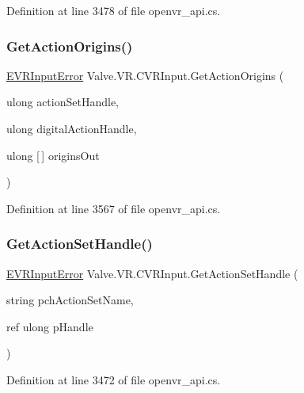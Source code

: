 Definition at line 3478 of file openvr\+\_\+api.\+cs.

\mbox{\label{class_valve_1_1_v_r_1_1_c_v_r_input_a3558bf9618b7b75df19f79741aa32fc9}} 
\subsubsection{\texorpdfstring{GetActionOrigins()}{GetActionOrigins()}}
{\footnotesize\ttfamily \mbox{\hyperlink{namespace_valve_1_1_v_r_a592d7f4189b8346d6c96dbdbaa35bc1b}{E\+V\+R\+Input\+Error}} Valve.\+V\+R.\+C\+V\+R\+Input.\+Get\+Action\+Origins (\begin{DoxyParamCaption}\item[{ulong}]{action\+Set\+Handle,  }\item[{ulong}]{digital\+Action\+Handle,  }\item[{ulong \mbox{[}$\,$\mbox{]}}]{origins\+Out }\end{DoxyParamCaption})}



Definition at line 3567 of file openvr\+\_\+api.\+cs.

\mbox{\label{class_valve_1_1_v_r_1_1_c_v_r_input_acab9fd21a87197d93ad858f568118f68}} 
\subsubsection{\texorpdfstring{GetActionSetHandle()}{GetActionSetHandle()}}
{\footnotesize\ttfamily \mbox{\hyperlink{namespace_valve_1_1_v_r_a592d7f4189b8346d6c96dbdbaa35bc1b}{E\+V\+R\+Input\+Error}} Valve.\+V\+R.\+C\+V\+R\+Input.\+Get\+Action\+Set\+Handle (\begin{DoxyParamCaption}\item[{string}]{pch\+Action\+Set\+Name,  }\item[{ref ulong}]{p\+Handle }\end{DoxyParamCaption})}



Definition at line 3472 of file openvr\+\_\+api.\+cs.

